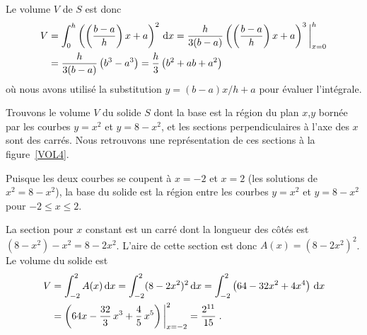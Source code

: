 {\begin{egg}
Le volume $V$ de $S$ est donc
\begin{align*}
V &= \int_0^h \left( \left(\frac{b-a}{h}\right) x + a \right)^2 \,\mathrm{d}x
= \frac{h}{3(b-a)}
\left( \left(\frac{b-a}{h}\right) x + a \right)^3\bigg|_{x=0}^h \\
&= \frac{h}{3(b-a)} \left( b^3 - a^3 \right)
= \frac{h}{3} \left( b^2+ab+a^2 \right)
\end{align*}
où nous avons utilisé la substitution $y = (b-a)x/h + a$ pour évaluer
l'intégrale.
\end{egg}


\begin{egg}
Trouvons le volume $V$ du solide $S$ dont la base est la région du plan
$x$,$y$ bornée par les courbes $y=x^2$ et $y=8-x^2$, et les sections
perpendiculaires à l'axe des $x$ sont des carrés.  Nous retrouvons une
représentation de ces sections à la figure~\ref{VOL4}.

Puisque les deux courbes se coupent à $x=-2$ et $x=2$ (les solutions
de $x^2=8-x^2$), la base du solide est la région entre les courbes $y=x^2$ et
$y=8-x^2$ pour $-2\leq x \leq 2$.

La section pour $x$ constant est un carré dont la longueur des côtés est
$(8-x^2)-x^2 = 8 - 2 x^2$.  L'aire de cette section est donc
$A(x)= (8-2x^2)^2$.  Le volume du solide est
\begin{align*}
V &= \int_{-2}^2 A(x)\,\mathrm{d}x = \int_{-2}^2 (8-2x^2)^2\,\mathrm{d}x
= \int_{-2}^2 \left(64 -32 x^2 + 4 x^4\right)\,\mathrm{d}x \\
&= \left(64x - \frac{32}{3}\,x^3 + \frac{4}{5}\,x^5\right)\bigg|_{x=-2}^2
= \frac{2^{11}}{15} \; .
\end{align*}
\end{egg}



}
